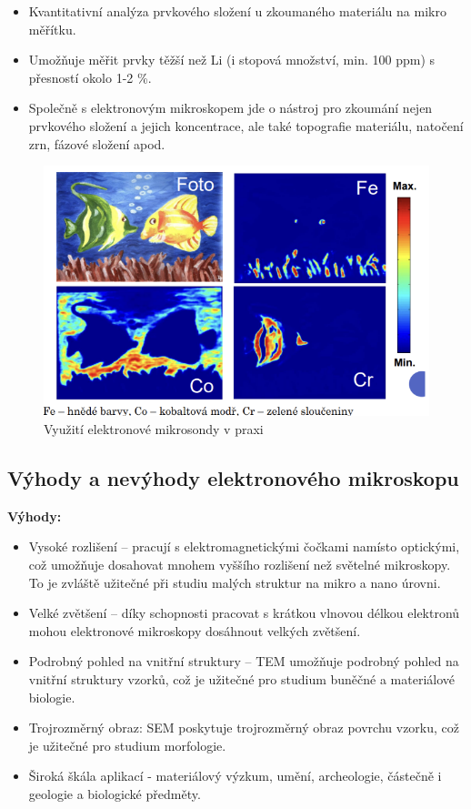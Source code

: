 \begin{itemize}
    \item Kvantitativní analýza prvkového složení u zkoumaného materiálu na mikro měřítku.
    \item Umožňuje měřit prvky těžší než Li (i stopová množství, min. 100 ppm) s přesností okolo 1-2 \%.
    \item Společně s elektronovým mikroskopem jde o nástroj pro zkoumání nejen prvkového složení a jejich koncentrace, ale také topografie materiálu, natočení zrn, fázové složení apod.
\end{itemize}

\begin{figure}[H]
    \centering
    \includegraphics[width=0.6\linewidth]{img/využití elektronové mikrosondy v praxi.png}
    \caption{Využití elektronové mikrosondy v praxi}
\end{figure}

\subsection{Výhody a nevýhody elektronového mikroskopu}

\textbf{Výhody:}
\begin{itemize}
    \item Vysoké rozlišení -- pracují s elektromagnetickými čočkami namísto optickými, což umožňuje dosahovat mnohem vyššího rozlišení než světelné mikroskopy. To je zvláště užitečné při studiu malých struktur na mikro a nano úrovni.
    \item Velké zvětšení -- díky schopnosti pracovat s krátkou vlnovou délkou elektronů mohou elektronové mikroskopy dosáhnout velkých zvětšení.
    \item Podrobný pohled na vnitřní struktury -- TEM umožňuje podrobný pohled na vnitřní struktury vzorků, což je užitečné pro studium buněčné a materiálové biologie.
    \item Trojrozměrný obraz: SEM poskytuje trojrozměrný obraz povrchu vzorku, což je užitečné pro studium morfologie.
    \item Široká škála aplikací - materiálový výzkum, umění, archeologie, částečně i geologie a biologické předměty.
\end{itemize}

